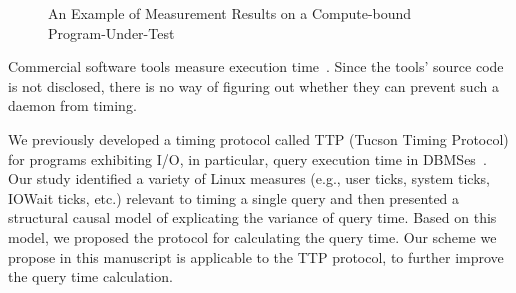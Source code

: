 \documentclass[letter]{ieice}
\begin{document}

\begin{figure}[t]
	\centering
	\caption{An Example of Measurement Results on a \linebreak \hbox{Compute-bound} 
	Program-Under-Test~\label{fig:meas_comp}}
	\vspace{-.18in}
\end{figure} 

Commercial software tools measure execution time~\cite{VTune,TimeSys,WindView}. 
Since the tools' source code is not disclosed, there is no way of figuring out 
whether they can prevent such a daemon from timing. 

We previously developed a timing protocol called TTP (Tucson Timing Protocol)
for programs exhibiting I/O, in particular, query execution time in \hbox{DBMSes}~\cite{Currim}.
Our study identified a variety of Linux measures 
(e.g., user ticks, system ticks, IOWait ticks, etc.) 
relevant to timing a single query and then 
presented a structural causal model 
of explicating the variance of query time. 
Based on this model, we proposed the protocol for calculating the query time. 
Our scheme we propose in this manuscript 
is applicable to the TTP protocol, to further improve the query time calculation.
\end{document}
